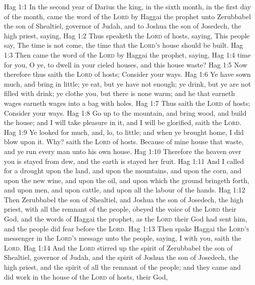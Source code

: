 \vs Hag 1:1 In the second year of Darius the king, in the sixth month, in the first day of the month, came the word of the \textsc{Lord} by Haggai the prophet unto Zerubbabel the son of Shealtiel, governor of Judah, and to Joshua the son of Josedech, the high priest, saying,
\vs Hag 1:2 Thus speaketh the \textsc{Lord} of hosts, saying, This people say, The time is not come, the time that the \textsc{Lord's} house should be built.
\vs Hag 1:3 Then came the word of the \textsc{Lord} by Haggai the prophet, saying,
\vs Hag 1:4  time for you, O ye, to dwell in your cieled houses, and this house  waste?
\vs Hag 1:5 Now therefore thus saith the \textsc{Lord} of hosts; Consider your ways.
\vs Hag 1:6 Ye have sown much, and bring in little; ye eat, but ye have not enough; ye drink, but ye are not filled with drink; ye clothe you, but there is none warm; and he that earneth wages earneth wages  into a bag with holes.
\vs Hag 1:7 Thus saith the \textsc{Lord} of hosts; Consider your ways.
\vs Hag 1:8 Go up to the mountain, and bring wood, and build the house; and I will take pleasure in it, and I will be glorified, saith the \textsc{Lord}.
\vs Hag 1:9 Ye looked for much, and, lo,  to little; and when ye brought  home, I did blow upon it. Why? saith the \textsc{Lord} of hosts. Because of mine house that  waste, and ye run every man unto his own house.
\vs Hag 1:10 Therefore the heaven over you is stayed from dew, and the earth is stayed  her fruit.
\vs Hag 1:11 And I called for a drought upon the land, and upon the mountains, and upon the corn, and upon the new wine, and upon the oil, and upon  which the ground bringeth forth, and upon men, and upon cattle, and upon all the labour of the hands.
\vs Hag 1:12 Then Zerubbabel the son of Shealtiel, and Joshua the son of Josedech, the high priest, with all the remnant of the people, obeyed the voice of the \textsc{Lord} their God, and the words of Haggai the prophet, as the \textsc{Lord} their God had sent him, and the people did fear before the \textsc{Lord}.
\vs Hag 1:13 Then spake Haggai the \textsc{Lord's} messenger in the \textsc{Lord's} message unto the people, saying, I  with you, saith the \textsc{Lord}.
\vs Hag 1:14 And the \textsc{Lord} stirred up the spirit of Zerubbabel the son of Shealtiel, governor of Judah, and the spirit of Joshua the son of Josedech, the high priest, and the spirit of all the remnant of the people; and they came and did work in the house of the \textsc{Lord} of hosts, their God,
